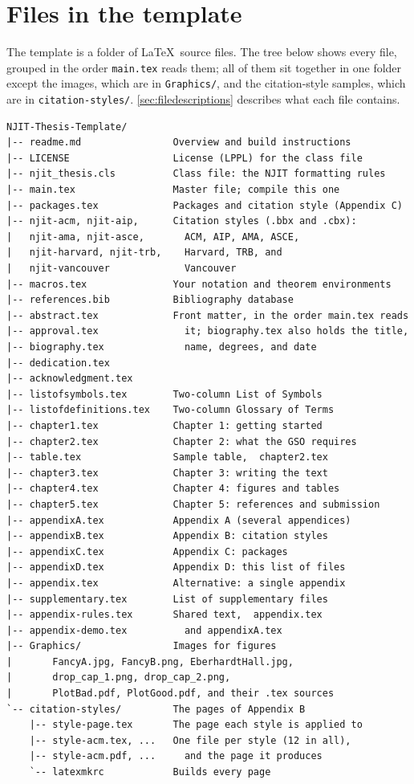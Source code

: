 
\chapter{Files in the template}
\label{app:filetree}

The template is a folder of \LaTeX\ source files. The tree below shows every file, grouped in the order \texttt{main.tex} reads them; all of them sit together in one folder except the images, which are in \texttt{Graphics/}, and the citation-style samples, which are in \texttt{citation-styles/}. \cref{sec:filedescriptions} describes what each file contains.

{\footnotesize
\begin{verbatim}
NJIT-Thesis-Template/
|-- readme.md                Overview and build instructions
|-- LICENSE                  License (LPPL) for the class file
|-- njit_thesis.cls          Class file: the NJIT formatting rules
|-- main.tex                 Master file; compile this one
|-- packages.tex             Packages and citation style (Appendix C)
|-- njit-acm, njit-aip,      Citation styles (.bbx and .cbx):
|   njit-ama, njit-asce,       ACM, AIP, AMA, ASCE,
|   njit-harvard, njit-trb,    Harvard, TRB, and
|   njit-vancouver             Vancouver
|-- macros.tex               Your notation and theorem environments
|-- references.bib           Bibliography database
|-- abstract.tex             Front matter, in the order main.tex reads
|-- approval.tex               it; biography.tex also holds the title,
|-- biography.tex              name, degrees, and date
|-- dedication.tex
|-- acknowledgment.tex
|-- listofsymbols.tex        Two-column List of Symbols
|-- listofdefinitions.tex    Two-column Glossary of Terms
|-- chapter1.tex             Chapter 1: getting started
|-- chapter2.tex             Chapter 2: what the GSO requires
|-- table.tex                Sample table,  chapter2.tex
|-- chapter3.tex             Chapter 3: writing the text
|-- chapter4.tex             Chapter 4: figures and tables
|-- chapter5.tex             Chapter 5: references and submission
|-- appendixA.tex            Appendix A (several appendices)
|-- appendixB.tex            Appendix B: citation styles
|-- appendixC.tex            Appendix C: packages
|-- appendixD.tex            Appendix D: this list of files
|-- appendix.tex             Alternative: a single appendix
|-- supplementary.tex        List of supplementary files
|-- appendix-rules.tex       Shared text,  appendix.tex
|-- appendix-demo.tex          and appendixA.tex
|-- Graphics/                Images for figures
|       FancyA.jpg, FancyB.png, EberhardtHall.jpg,
|       drop_cap_1.png, drop_cap_2.png,
|       PlotBad.pdf, PlotGood.pdf, and their .tex sources
`-- citation-styles/         The pages of Appendix B
    |-- style-page.tex       The page each style is applied to
    |-- style-acm.tex, ...   One file per style (12 in all),
    |-- style-acm.pdf, ...     and the page it produces
    `-- latexmkrc            Builds every page
\end{verbatim}
}

